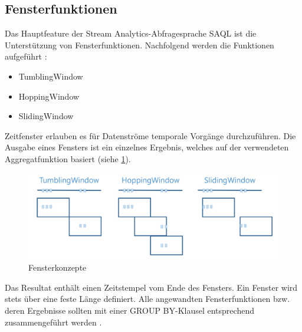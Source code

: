\subsection{Fensterfunktionen}
Das Hauptfeature der Stream Analytics-Abfragesprache SAQL ist die Unterstützung von Fensterfunktionen. Nachfolgend werden die Funktionen aufgeführt \cite{Prosise.}: 
\begin{itemize} 
	\item TumblingWindow
	\item HoppingWindow
	\item SlidingWindow
\end{itemize}
Zeitfenster erlauben es für Datenströme temporale Vorgänge durchzuführen. Die Ausgabe eines Fensters ist ein einzelnes Ergebnis, welches auf der verwendeten Aggregatfunktion basiert (siehe \ref{fig:window_concepts}). 
\begin{figure}[H]
	\centering
	\includegraphics[width=1.0\linewidth]{images/fensterfunktionen}
	\caption{Fensterkonzepte \cite{Prosise.}} %
	\label{fig:window_concepts}
\end{figure} 
Das Resultat enthält einen Zeitstempel vom Ende des Fensters. Ein Fenster wird stets über eine feste Länge definiert. Alle angewandten Fensterfunktionen bzw. deren Ergebnisse sollten mit einer GROUP BY-Klausel entsprechend zusammengeführt werden \cite{Azure.2017}. 
